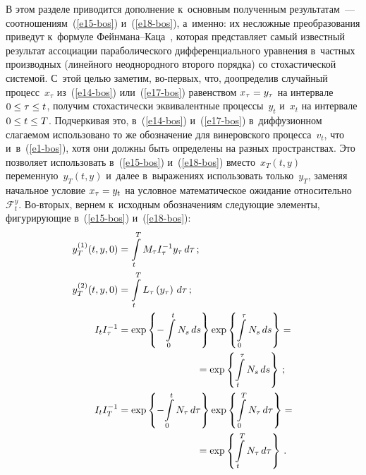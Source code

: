 \begin{multicols}{2}
     В этом разделе приводится дополнение к~основным полученным 
результатам~--- соотношениям~(\ref{e15-bos}) и~(\ref{e18-bos}), а~именно: 
их несложные преобразования приведут к~формуле  
Фейн\-ма\-на--Ка\-ца~\cite{9-bos}, которая представляет самый известный 
результат ассоциации параболического дифференциального уравнения 
в~частных производных (линейного неоднородного второго порядка) со 
стохастической системой. С~этой целью заметим, во-пер\-вых, что, 
доопределив случайный процесс~$x_\tau$ из~(\ref{e14-bos})  
или~(\ref{e17-bos}) равенством $x_\tau\hm=y_\tau$ на интервале $0\hm\leq 
\tau\hm\leq t$, получим стохастически эквивалентные процессы~$y_t$ 
и~$x_t$ на интервале $0\hm\leq t\hm\leq T$. Подчеркивая это, в~(\ref{e14-bos}) 
и~(\ref{e17-bos}) в~диффузионном слагаемом использовано то же 
обозначение для винеровского процесса~$v_t$, что и~в~(\ref{e1-bos}), хотя 
они должны быть определены на разных пространствах. Это позволяет 
использовать в~(\ref{e15-bos}) и~(\ref{e18-bos}) вместо~$x_T(t,y)$ 
переменную~$y_T(t,y)$ и~далее в~выражениях использовать только~$y_T$, 
заменяя начальное условие $x_\tau\hm=y_t$ на условное математическое 
ожидание относительно~$\mathcal{F}_t^y$. Во-вто\-рых, вернем к~исходным 
обозначениям следующие элементы, фигурирующие в~(\ref{e15-bos}) 
и~(\ref{e18-bos}):
     \begin{align*}
     y_T^{(1)}(t,y,0)&=\int\limits_t^T M_\tau I_\tau^{-1} y_\tau\,d\tau\,;\\ 
y_T^{(2)}(t,y,0)&=\int\limits^T_t L_\tau\left( y_\tau\right)\,d\tau\,;\\
     I_t I_\tau^{-1}&=\exp \left\{ -\int\limits_0^t N_s \,ds\right\} \exp  \left\{ 
\int\limits_0^\tau N_s\,ds\right\} ={}\\
&\hspace*{28mm}{}=\exp \left\{ \int\limits_t^\tau N_s\,ds\right\}\,;\\
     I_t I_T^{-1}&=\exp\left\{ -\!\int\limits_0^t N_\tau\,d\tau\right\}\exp \left\{ 
\int\limits_0^T N_\tau\,d\tau\right\} ={}\hspace*{-16pt}\\
&\hspace*{28mm} {}=\exp \left\{ \int\limits_t^T 
N_\tau\,d\tau\right\}\,.
     \end{align*}
     

\end{multicols}
